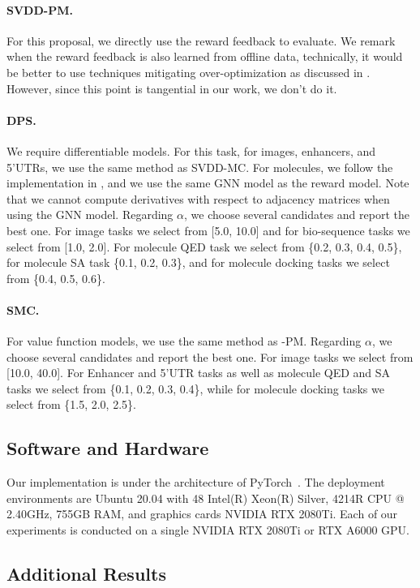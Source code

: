 \paragraph{SVDD-PM.} For this proposal, we directly use the reward feedback to evaluate. We remark when the reward feedback is also learned from offline data, technically, it would be better to use techniques mitigating over-optimization as discussed in \citet{uehara2024bridging}. However, since this point is tangential in our work, we don't do it. 

\paragraph{DPS.} We require differentiable models. For this task, for images, enhancers, and 5'UTRs, we use the same method as SVDD-MC. For molecules, we follow the implementation in \citet{lee2023exploring}, and we use the same GNN model as the reward model. Note that we cannot compute derivatives with respect to adjacency matrices when using the GNN model. Regarding $\alpha$, we choose several candidates and report the best one. For image tasks we select from [5.0, 10.0] and for bio-sequence tasks we select from [1.0, 2.0]. For molecule QED task we select from \{0.2, 0.3, 0.4, 0.5\}, for molecule SA task \{0.1, 0.2, 0.3\}, and for molecule docking tasks we select from \{0.4, 0.5, 0.6\}.


\paragraph{SMC.} For value function models, we use the same method as \alg-PM. Regarding $\alpha$, we choose several candidates and report the best one. For image tasks we select from [10.0, 40.0]. For Enhancer and 5'UTR tasks as well as molecule QED and SA tasks we select from \{0.1, 0.2, 0.3, 0.4\}, while for molecule docking tasks we select from \{1.5, 2.0, 2.5\}.

\subsection{Software and Hardware}
Our implementation is under the architecture of PyTorch~\citep{paszke2019pytorch}. The deployment environments are Ubuntu 20.04 with 48 Intel(R) Xeon(R) Silver, 4214R CPU @ 2.40GHz, 755GB RAM, and graphics cards NVIDIA RTX 2080Ti. Each of our experiments is conducted on a single NVIDIA RTX 2080Ti or RTX A6000 GPU.

\subsection{Additional Results}\label{sec:additional_results}


